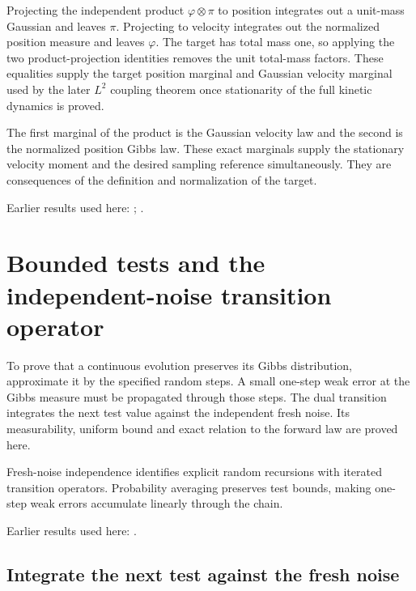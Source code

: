 \documentclass[11pt,a4paper]{report}
\begin{document}
Projecting the independent product \(\varphi\otimes\pi\) to position integrates out a unit-mass Gaussian and leaves \(\pi\). Projecting to velocity integrates out the normalized position measure and leaves \(\varphi\). The target has total mass one, so applying the two product-projection identities removes the unit total-mass factors. These equalities supply the target position marginal and Gaussian velocity marginal used by the later \(L^{2}\) coupling theorem once stationarity of the full kinetic dynamics is proved.



The first marginal of the product is the Gaussian velocity law and the second is the normalized position Gibbs law. These exact marginals supply the stationary velocity moment and the desired sampling reference simultaneously. They are consequences of the definition and normalization of the target.



Earlier results used here: \cite[Section~3.26.13]{LangevinLean2026ULASC}; \cite[Section~3.26.3]{LangevinLean2026ULASC}.
\section{\texorpdfstring{Bounded tests and the independent-noise transition operator}{Bounded tests and the independent-noise transition operator}}
\label{proof-module-KineticLangevin-MarkovTests-lean}


To prove that a continuous evolution preserves its Gibbs distribution, approximate it by the specified random steps. A small one-step weak error at the Gibbs measure must be propagated through those steps. The dual transition integrates the next test value against the independent fresh noise. Its measurability, uniform bound and exact relation to the forward law are proved here.



Fresh-noise independence identifies explicit random recursions with iterated transition operators. Probability averaging preserves test bounds, making one-step weak errors accumulate linearly through the chain.



Earlier results used here: \cite[Section~3.33]{LangevinLean2026ULASC}.
\subsection{\texorpdfstring{Integrate the next test against the fresh noise}{Integrate the next test against the fresh noise}}
\label{report-step-KineticLangevin-MarkovTests-lean-1}
\end{document}
